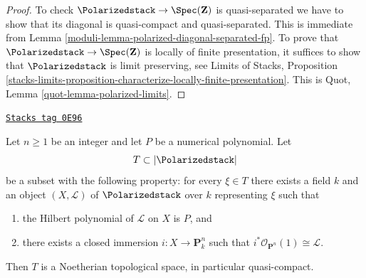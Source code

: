 \begin{proof}

To check $\Polarizedstack \to \Spec(\mathbf{Z})$ is quasi-separated we have to
show that its diagonal is quasi-compact and quasi-separated.
This is immediate from Lemma \ref{moduli-lemma-polarized-diagonal-separated-fp}.
To prove that $\Polarizedstack \to \Spec(\mathbf{Z})$ is locally of finite
presentation, it suffices to show that $\Polarizedstack$
is limit preserving, see Limits of Stacks, Proposition
\ref{stacks-limits-proposition-characterize-locally-finite-presentation}.
This is Quot, Lemma \ref{quot-lemma-polarized-limits}.
\end{proof}

\begin{lemma}
\label{moduli-lemma-bounded-polarized}
\href{https://stacks.math.columbia.edu/tag/0E96}{\texttt{Stacks tag 0E96}}

Let $n \geq 1$ be an integer and let $P$ be a numerical polynomial.
Let
$$
T \subset |\Polarizedstack|
$$
be a subset with the following property: for every $\xi \in T$
there exists a field $k$ and an object $(X, \mathcal{L})$
of $\Polarizedstack$ over $k$ representing $\xi$ such that
\begin{enumerate}
\item the Hilbert polynomial of $\mathcal{L}$ on $X$ is $P$, and
\item there exists a closed immersion $i : X \to \mathbf{P}^n_k$
such that $i^*\mathcal{O}_{\mathbf{P}^n}(1) \cong \mathcal{L}$.
\end{enumerate}
Then $T$ is a Noetherian topological space, in particular quasi-compact.
\end{lemma}

